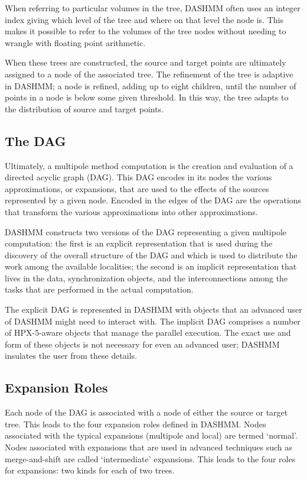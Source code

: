 When referring to particular volumes in the tree, DASHMM often uses an integer
index giving which level of the tree and where on that level the node is. This
makes it possible to refer to the volumes of the tree nodes without needing to
wrangle with floating point arithmetic.

When these trees are constructed, the source and target points are ultimately
assigned to a node of the associated tree. The refinement of the tree is
adaptive in DASHMM; a node is refined, adding up to eight children, until the
number of points in a node is below some given threshold. In this way, the
tree adapts to the distribution of source and target points.

\subsection{The DAG}

Ultimately, a multipole method computation is the creation and evaluation of
a directed acyclic graph (DAG). This DAG encodes in its nodes the various
approximations, or expansions, that are used to the effects of the sources
represented by a given node. Encoded in the edges of the DAG are the operations
that transform the various approximations into other approximations.

DASHMM constructs two versions of the DAG representing a given multipole
computation: the first is an explicit representation that is used during the
discovery of the overall structure of the DAG and which is used to distribute
the work among the available localities; the second is an implicit
representation that lives in the data, synchronization objects, and the
interconnections among the tasks that are performed in the actual computation.

The explicit DAG is represented in DASHMM with objects that an advanced user of
DASHMM might need to interact with. The implicit DAG comprises a number of
HPX-5-aware objects that manage the parallel execution. The exact use and form
of these objects is not necessary for even an advanced user; DASHMM insulates
the user from these details.

\subsection{Expansion Roles}

Each node of the DAG is associated with a node of either the source or target
tree. This leads to the four expansion roles defined in DASHMM. Nodes
associated with the typical expansions (multipole and local) are termed
`normal'. Nodes associated with expansions that are used in advanced techniques
such as merge-and-shift are called `intermediate' expansions. This leads to
the four roles for expansions: two kinds for each of two trees.

